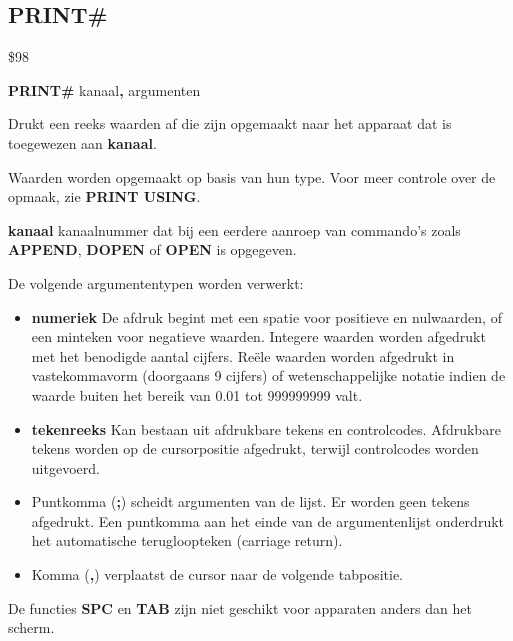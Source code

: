 
\newpage
\subsection{PRINT\#}
\begin{description}[leftmargin=2cm,style=nextline]
\item [Token:]    \$98

\item [Formaat:]   {\bf PRINT\#} kanaal{\bf,} argumenten

\item [Gebruik:]    Drukt een reeks waarden af die zijn opgemaakt naar het apparaat dat is toegewezen aan {\bf kanaal}.

                  Waarden worden opgemaakt op basis van hun type. Voor meer controle over de opmaak, zie {\bf PRINT USING}.

{\bf kanaal} kanaalnummer dat bij een eerdere aanroep van commando's zoals {\bf APPEND}, {\bf DOPEN} of {\bf OPEN} is opgegeven.

                  De volgende argumententypen worden verwerkt:
                  \begin{itemize}
                     \item {\bf numeriek} De afdruk begint met een spatie voor positieve en nulwaarden, of een minteken voor negatieve waarden. Integere waarden worden afgedrukt met het benodigde aantal cijfers. Reële waarden worden afgedrukt in vastekommavorm (doorgaans 9 cijfers) of wetenschappelijke notatie indien de waarde buiten het bereik van 0.01 tot 999999999 valt.                     \item {\bf tekenreeks} Kan bestaan uit afdrukbare tekens en controlcodes. Afdrukbare tekens worden op de cursorpositie afgedrukt, terwijl controlcodes worden uitgevoerd.                     \item Puntkomma ({\bf ;}) scheidt argumenten van de lijst. Er worden geen tekens afgedrukt. Een puntkomma aan het einde van de argumentenlijst onderdrukt het automatische terugloopteken (carriage return).                     \item Komma ({\bf ,}) verplaatst de cursor naar de volgende tabpositie.
                  \end{itemize}

\item [Opmerkingen:]  De functies {\bf SPC} en {\bf TAB} zijn niet geschikt voor apparaten anders dan het scherm.


\end{description}
